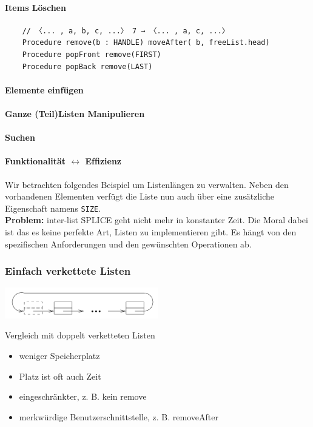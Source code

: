 \paragraph{Items Löschen}
\begin{verbatim}
    // 〈... , a, b, c, ...〉 7 → 〈... , a, c, ...〉
    Procedure remove(b : HANDLE) moveAfter( b, freeList.head)
    Procedure popFront remove(FIRST)
    Procedure popBack remove(LAST)
\end{verbatim}
\paragraph{Elemente einfügen}
\paragraph{Ganze (Teil)Listen Manipulieren}
\paragraph{Suchen}
\paragraph{Funktionalität \(\leftrightarrow\) Efﬁzienz}
Wir betrachten folgendes Beispiel um Listenlängen zu verwalten. Neben den vorhandenen Elementen verfügt die Liste nun auch über eine zusätzliche Eigenschaft namens \texttt{SIZE}.\\
\textbf{Problem:} inter-list SPLICE geht nicht mehr in konstanter Zeit.
Die Moral dabei ist das es keine perfekte Art, Listen zu implementieren gibt. Es hängt von den spezifischen Anforderungen und den gewünschten Operationen ab.

\newpage

\subsubsection{Einfach verkettete Listen}
\begin{center}
    \centering
    \includegraphics[width=0.5\textwidth]{folgen-felder-listen/abb_3.png}
    \label{fig:abb_2}
\end{center}

Vergleich mit doppelt verketteten Listen
\begin{itemize}
    \item weniger Speicherplatz
    \item Platz ist oft auch Zeit
    \item eingeschränkter, z. B. kein remove
    \item merkwürdige Benutzerschnittstelle, z. B. removeAfter
\end{itemize}

